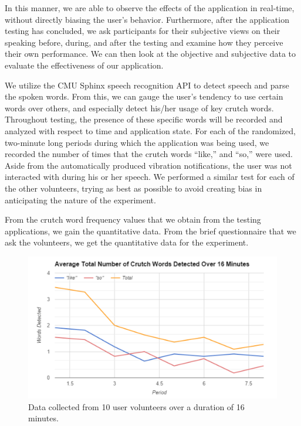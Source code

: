 \documentclass{sigchi}
\begin{document}
In this manner, we are able to observe the effects of the application in real-time, without directly biasing the user’s behavior. Furthermore, after the application testing has concluded, we ask participants for their subjective views on their speaking before, during, and after the testing and examine how they perceive their own performance. We can then look at the objective and subjective data to evaluate the effectiveness of our application.

We utilize the CMU Sphinx speech recognition API to detect speech and parse the spoken words. From this, we can gauge the user’s tendency to use certain words over others, and especially detect his/her usage of key crutch words. Throughout testing, the presence of these specific words will be recorded and analyzed with respect to time and application state.  For each of the randomized, two-minute long periods during which the application was being used, we recorded the number of times that the crutch words “like,” and “so,” were used. Aside from the automatically produced vibration notifications, the user was not interacted with during his or her speech. We performed a similar test for each of the other volunteers, trying as best as possible to avoid creating bias in anticipating the nature of the experiment.

From the crutch word frequency values that we obtain from the testing applications, we gain the quantitative data. From the brief questionnaire that we ask the volunteers, we get the quantitative data for the experiment. 

\begin{figure}[!h]
\centering
\includegraphics[width=0.9\columnwidth]{graph}
\caption{Data collected from 10 user volunteers over a duration of 16 minutes.
}
\label{fig:figure2}
\end{figure}
\end{document}

